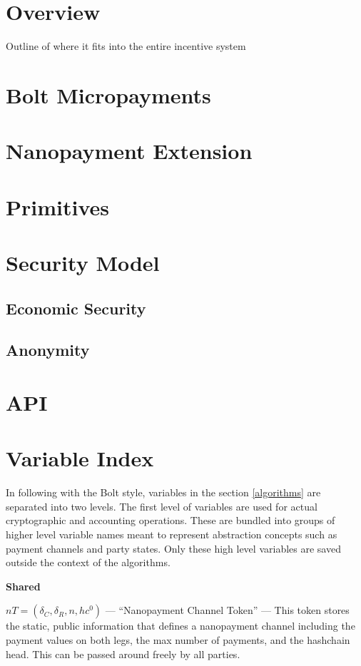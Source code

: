 \documentclass{article}
\begin{document}
\section{Overview}
Outline of where it fits into the entire incentive system
\section{Bolt Micropayments}

\section{Nanopayment Extension}

\section{Primitives}

\section{Security Model}

\subsection{Economic Security}

\subsection{Anonymity}

\section{API}

\section{Variable Index}\label{variable index}

In following with the Bolt style, variables in the section
\ref{algorithms} are separated into two levels. The first level of
variables are used for actual cryptographic and accounting
operations. These are bundled into groups of higher level variable
names meant to represent abstraction concepts such as payment channels
and party states. Only these high level variables are saved outside
the context of the algorithms.

\textbf{Shared}

$nT = (\delta_C, \delta_R, n, hc^0)$ --- ``Nanopayment Channel Token'' ---
This token stores the static, public information that defines a
nanopayment channel including the payment values on both legs, the max
number of payments, and the hashchain head. This can be passed around
freely by all parties.
\end{document}
